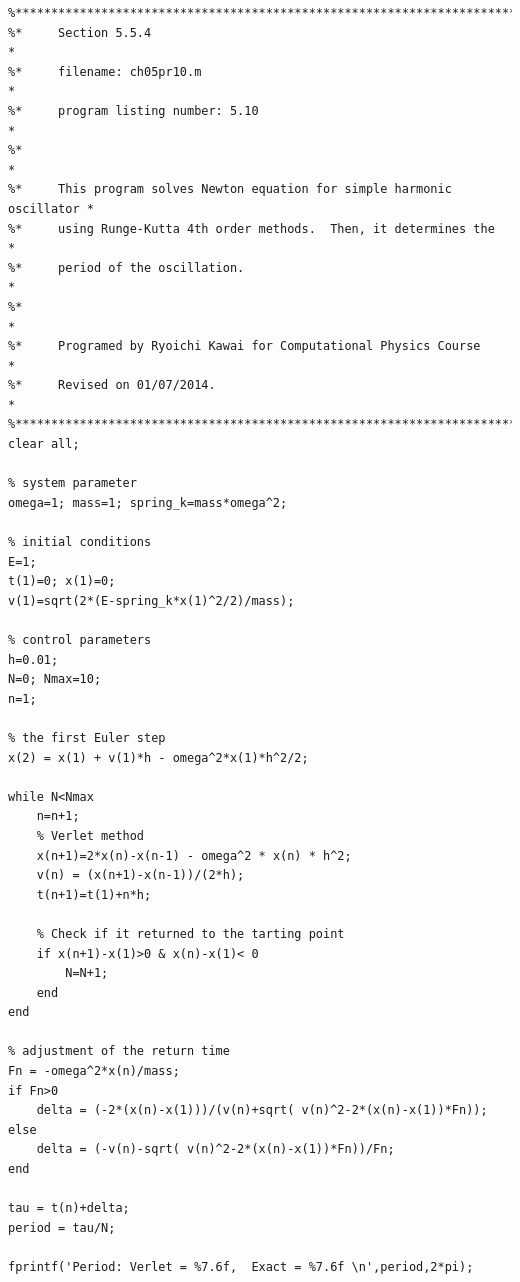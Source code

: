 \footnotesize
\begin{verbatim}
%**************************************************************************
%*     Section 5.5.4                                                      *
%*     filename: ch05pr10.m                                               *
%*     program listing number: 5.10                                       *
%*                                                                        *
%*     This program solves Newton equation for simple harmonic oscillator *
%*     using Runge-Kutta 4th order methods.  Then, it determines the      *
%*     period of the oscillation.                                         *
%*                                                                        *
%*     Programed by Ryoichi Kawai for Computational Physics Course        *
%*     Revised on 01/07/2014.                                             *
%**************************************************************************
clear all;

% system parameter
omega=1; mass=1; spring_k=mass*omega^2;

% initial conditions
E=1; 
t(1)=0; x(1)=0;
v(1)=sqrt(2*(E-spring_k*x(1)^2/2)/mass);

% control parameters
h=0.01;
N=0; Nmax=10;
n=1;

% the first Euler step
x(2) = x(1) + v(1)*h - omega^2*x(1)*h^2/2;

while N<Nmax
    n=n+1;
    % Verlet method
    x(n+1)=2*x(n)-x(n-1) - omega^2 * x(n) * h^2;
    v(n) = (x(n+1)-x(n-1))/(2*h);
    t(n+1)=t(1)+n*h;
    
    % Check if it returned to the tarting point
    if x(n+1)-x(1)>0 & x(n)-x(1)< 0 
        N=N+1;
    end
end

% adjustment of the return time
Fn = -omega^2*x(n)/mass;
if Fn>0 
    delta = (-2*(x(n)-x(1)))/(v(n)+sqrt( v(n)^2-2*(x(n)-x(1))*Fn));
else
    delta = (-v(n)-sqrt( v(n)^2-2*(x(n)-x(1))*Fn))/Fn;
end

tau = t(n)+delta;
period = tau/N;

fprintf('Period: Verlet = %7.6f,  Exact = %7.6f \n',period,2*pi);
\end{verbatim}
\normalsize



\bigskip
\noindent
\program
\label{prog:pendulum}

